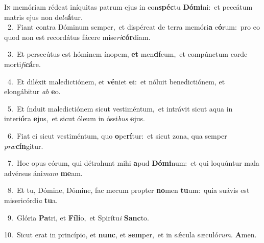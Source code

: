 \lettrine{\initial\textcolor{\initialcolor}{I}}{n} memóriam rédeat iníquitas patrum ejus in con\-\textbf{spéc}\-tu \textbf{Dó}\-\textbf{mi}ni:~\star et peccátum matris ejus non de\-\textit{le}\-\textbf{á}tur.\\
{\numbfont\textcolor{\numbcolor}{~2.}}~Fiant contra Dóminum semper,~\dagger et dispéreat de terra memóri\textbf{a} e\-\textbf{ó}\-rum:~\star pro eo quod non est recordátus fácere mise\-\textit{ri}\-\textbf{cór}diam.\par
{\numbfont\textcolor{\numbcolor}{~3.}}~Et persecútus est hóminem ínopem, \textbf{et} men\-\textbf{dí}\-cum,~\star et compúnctum corde morti\-\textit{fi}\-\textbf{cá}re.\par
{\numbfont\textcolor{\numbcolor}{~4.}}~Et diléxit maledictiónem, et \textbf{vé}\-niet \textbf{e}\-i:~\star et nóluit benedictiónem, et elongábitur \textit{ab} \textbf{e}\-o.\par
{\numbfont\textcolor{\numbcolor}{~5.}}~Et índuit maledictiónem sicut vestiméntum,~\dagger et intrávit sicut aqua in interi\-\textbf{ó}\-ra \textbf{e}\-jus,~\star et sicut óleum in óssi\textit{bus} \textbf{e}\-jus.\par
{\numbfont\textcolor{\numbcolor}{~6.}}~Fiat ei sicut vestiméntum, quo \textbf{o}\-pe\-\textbf{rí}\-tur:~\star et sicut zona, qua semper \textit{præ}\-\textbf{cín}gitur.\par
{\numbfont\textcolor{\numbcolor}{~7.}}~Hoc opus eórum, qui détrahunt mihi \textbf{a}\-pud \textbf{Dó}\-\textbf{mi}num:~\star et qui loquúntur mala advérsus áni\textit{mam} \textbf{me}\-am.\par
{\numbfont\textcolor{\numbcolor}{~8.}}~Et tu, Dómine, Dómine, fac mecum propter \textbf{no}\-men \textbf{tu}\-um:~\star quia suávis est misericórdi\textit{a} \textbf{tu}\-a.\par
{\numbfont\textcolor{\numbcolor}{~9.}}~Glória \textbf{Pa}\-tri, et \textbf{Fí}\-\textbf{li}o,~\star et Spirítu\textit{i} \textbf{Sanc}\-to.\par
{\numbfont\textcolor{\numbcolor}{10.}}~Sicut erat in princípio, et \textbf{nunc}\-, et \textbf{sem}\-per,~\star et in sǽcula sæculó\-\textit{rum}\-. \textbf{A}\-men.\par
